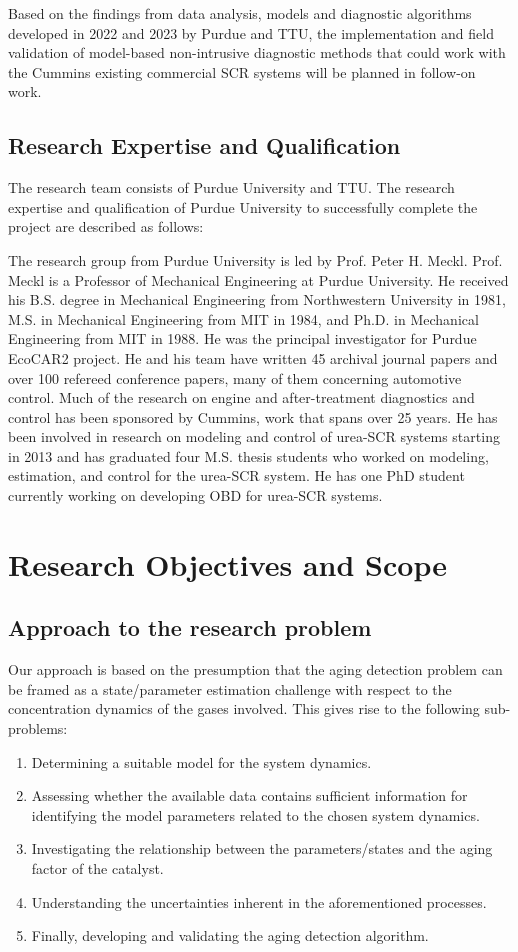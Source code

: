 Based on the findings from data analysis, models and diagnostic algorithms
developed in 2022 and 2023 by Purdue and TTU, the implementation and field
validation of model-based non-intrusive diagnostic methods that could work with
the Cummins existing commercial SCR systems will be planned in follow-on work.

\subsection{Research Expertise and Qualification}
The research team consists of Purdue University and TTU. The research expertise and qualification of Purdue University to successfully complete the project are described as follows:

The research group from Purdue University is led by Prof. Peter H. Meckl. Prof.
Meckl is a Professor of Mechanical Engineering at Purdue University. He received
his B.S. degree in Mechanical Engineering from Northwestern University in 1981,
M.S. in Mechanical Engineering from MIT in 1984, and Ph.D. in Mechanical
Engineering from MIT in 1988. He was the principal investigator for Purdue
EcoCAR2 project. He and his team have written 45 archival journal papers and
over 100 refereed conference papers, many of them concerning automotive control.
Much of the research on engine and after-treatment diagnostics and control has
been sponsored by Cummins, work that spans over 25 years. He has been involved
in research on modeling and control of urea-SCR systems starting in 2013 and has
graduated four M.S. thesis students who worked on modeling, estimation, and
control for the urea-SCR system. He has one PhD student currently
working on developing OBD for urea-SCR systems.


\section{Research Objectives and Scope}
\subsection{Approach to the research problem}
Our approach is based on the presumption that the aging detection problem can be framed as a state/parameter estimation challenge with respect to the concentration dynamics of the gases involved. This gives rise to the following sub-problems:

\begin{enumerate}
\item Determining a suitable model for the system dynamics.
\item Assessing whether the available data contains sufficient information for identifying the model parameters related to the chosen system dynamics.
\item Investigating the relationship between the parameters/states and the aging factor of the catalyst.
\item Understanding the uncertainties inherent in the aforementioned processes.
\item Finally, developing and validating the aging detection algorithm.
\end{enumerate}

